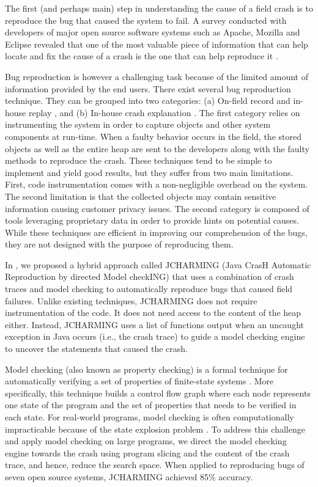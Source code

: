\documentclass[times]{smrauth}
\begin{document}
The first (and perhaps main) step in understanding the cause of a field crash is to reproduce the bug that caused the system to fail. A survey conducted with developers of major open source software systems such as Apache, Mozilla and Eclipse revealed that
one of the most valuable piece of information that can help
locate and fix the cause of a crash is the one that can help
reproduce it \cite{Bettenburg2008}.

Bug reproduction is however a challenging task because of the limited amount of information  provided by the end users. There exist several bug reproduction technique. They can be grouped into two categories: (a)
On-field record and in-house replay \cite{Narayanasamy2005,Artzi2008,Jaygarl}, and (b) In-house crash explanation \cite{Manevich2004,chandra2009snugglebug}. The first category relies on
instrumenting the system in order to capture objects and other
system components at run-time. When a faulty behavior
occurs in the field, the stored objects as well as the entire heap
are sent to the developers along with the faulty methods to
reproduce the crash. These techniques tend to be simple to
implement and yield good results, but they suffer from two
main limitations. First, code instrumentation comes with a
non-negligible overhead on the system. The second limitation
is that the collected objects may contain sensitive information
causing customer privacy issues. The second category is
composed of tools leveraging proprietary data in order to
provide hints on potential causes. While these techniques are
efficient in improving our comprehension of the bugs, they are
not designed with the purpose of reproducing them.

In  \cite{Nayrolles2015}, we proposed a hybrid approach called JCHARMING
(Java CrasH Automatic Reproduction by directed Model
checkING) that uses a combination of crash traces and model
checking to automatically reproduce bugs that caused field
failures. Unlike existing techniques, JCHARMING does not
require instrumentation of the code. It does not need access to
the content of the heap either. Instead, JCHARMING uses a
list of functions output when an uncaught exception in Java
occurs (i.e., the crash trace) to guide a model checking engine
to uncover the statements that caused the crash. 

Model checking (also known as property checking) is a formal
technique for automatically verifying a set of properties of
finite-state systems \cite{Baier2008}. More specifically, this technique
builds a control flow graph where each node represents one
state of the program and the set of properties that needs to be
verified in each state. For real-world programs, model
checking is often computationally impracticable because of
the state explosion problem \cite{Baier2008}. To address this challenge and
apply model checking on large programs, we direct the model
checking engine towards the crash using program slicing and
the content of the crash trace, and hence, reduce the search
space. When applied to reproducing bugs of seven open source  systems, JCHARMING achieved  85\% accuracy. 
\end{document}
